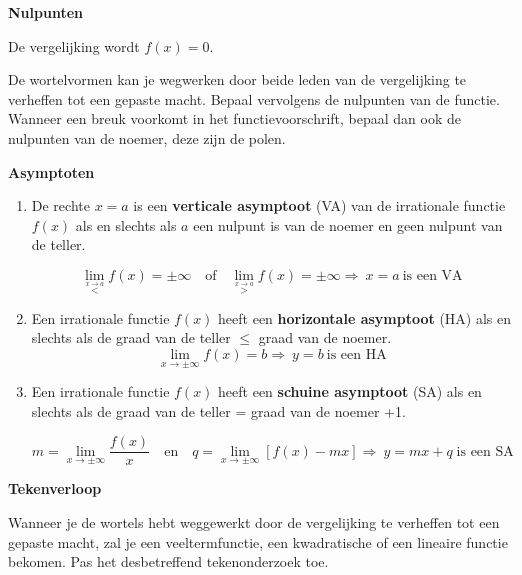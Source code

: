 \textbf{Nulpunten}

De vergelijking wordt $f(x)=0$.

De wortelvormen kan je wegwerken door beide leden van de vergelijking
te verheffen tot een gepaste macht. Bepaal vervolgens de nulpunten
van de functie. Wanneer een breuk voorkomt in het functievoorschrift,
bepaal dan ook de nulpunten van de noemer, deze zijn de polen.

\textbf{Asymptoten}

\begin{enumerate}
	\item De rechte $x=a$ is een \textbf{verticale asymptoot} (VA) van de
irrationale functie $f(x)$ als en slechts als $a$ een nulpunt is
van de noemer en geen nulpunt van de teller.

\begin{equation*}
\lim_{\overset{x\rightarrow a}{<}}f(x)=\pm\infty\quad\textrm{of}\quad \lim_{\overset{x\rightarrow a}{>}}f(x)=\pm\infty \Rightarrow\:x=a\:\textrm{is een VA}
\end{equation*}

\item Een irrationale functie $f(x)$ heeft een \textbf{horizontale asymptoot}
(HA) als en slechts als de graad van de teller $\le$ graad
van de noemer.
\begin{equation*}
\lim_{x\to\pm\infty}f(x)=b \Rightarrow\:y=b\:\textrm{is een HA}
\end{equation*}

\item Een irrationale functie $f(x)$ heeft een \textbf{schuine asymptoot}
(SA) als en slechts als de graad van de teller = graad van de noemer
+1.

\begin{equation*}
m=\lim_{x\to\pm\infty}\frac{f(x)}{x}\quad\textrm{en}\quad 
q= \lim_{x\to\pm\infty}\left[f(x)-mx\right]
\Rightarrow\:y=mx+q\;\textrm{is een SA}
\end{equation*}

\end{enumerate}


\textbf{Tekenverloop}

Wanneer je de wortels hebt weggewerkt door de vergelijking te verheffen
tot een gepaste macht, zal je een veeltermfunctie, een kwadratische
of een lineaire functie bekomen. Pas het desbetreffend tekenonderzoek
toe.


